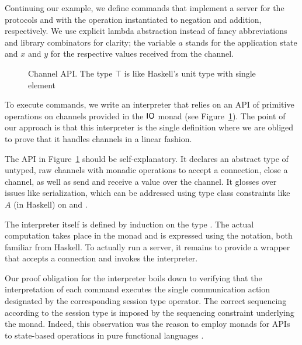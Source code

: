 \documentclass[acmsmall,screen]{acmart}
\begin{document}
Continuing our example, we define commands that implement a server
for the protocols {\Aunaryp} and {\Abinaryp} with the operation instantiated to
negation and addition, respectively.
\stNegpCommand
\stAddpCommand  
 We use explicit lambda abstraction instead of fancy abbreviations and library combinators
for clarity; the variable $a$ stands for the application state and $x$ and $y$ for
the respective values received from the channel.

\begin{figure}[tp]
\stPostulates  
  \caption{Channel API. The type $\top$ is like
  Haskell's unit type with single element {\Att}}
  \label{fig:channel-api}
\end{figure}
To execute commands, we write an
interpreter that relies on an API of primitive operations on channels provided
in the $\AIO$ monad (see Figure~\ref{fig:channel-api}). The point of our approach is that this
interpreter is the single definition where we are obliged to prove
that it handles channels in a linear fashion. 

The API in Figure~\ref{fig:channel-api} should be self-explanatory. It declares an abstract type of
untyped, raw channels with monadic operations to accept a connection, close a channel, as
well as send and receive a value over the channel. It glosses over issues like
serialization, which can be addressed using type class constraints like
{\ASerialize~$A$} (in Haskell) on {\AprimSend} and {\AprimRecv}.

The interpreter itself is defined by induction on the type
{\ACommand}. The actual computation takes place in the {\AIO} monad and is expressed using the {\Ado} notation, both
familiar from Haskell. 
\stExecutorSignature\vspace{-1.5\baselineskip}
\stExecutor
To actually run a server, it remains to provide a wrapper that accepts
a connection and invokes the interpreter.
\stAcceptor

Our proof obligation for the interpreter boils down to verifying that
the interpretation of each command executes the single communication
action designated by the corresponding session type operator. The
correct sequencing according to the session type is imposed by the
sequencing constraint underlying the {\AIO} monad. Indeed, this
observation was the reason to employ monads for APIs to state-based
operations in pure functional languages \cite{DBLP:conf/popl/JonesW93}.
\end{document}
